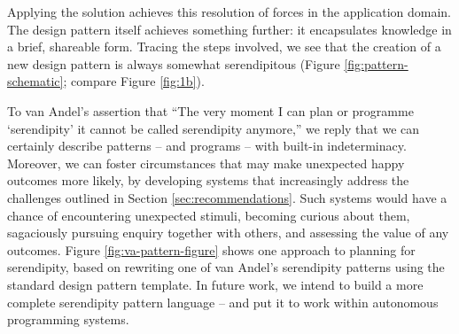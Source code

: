 %
%
Applying the solution achieves this resolution of forces in the
application domain.
The design pattern itself achieves something further: it encapsulates
knowledge in a brief, shareable form.  Tracing the steps involved, we
see that the creation of a new design pattern is always somewhat
serendipitous (Figure \ref{fig:pattern-schematic}; compare Figure
\ref{fig:1b}).

To van Andel's assertion that ``The very moment I can plan or
programme `serendipity' it cannot be called serendipity anymore,'' we
reply that we can certainly describe patterns -- and programs -- with
built-in indeterminacy.  Moreover, we can foster circumstances that
may make unexpected happy outcomes more likely, by developing systems
that increasingly address the challenges outlined in Section
\ref{sec:recommendations}.  Such systems would have a chance of encountering
unexpected stimuli, becoming curious about them, sagaciously pursuing enquiry
together with others, and assessing the value of any outcomes.  
%
Figure \ref{fig:va-pattern-figure} shows one approach to
planning for serendipity, based on rewriting one of van Andel's
serendipity patterns using the standard design pattern template.  In
future work, we intend to build a more complete serendipity pattern
language -- and put it to work within autonomous programming systems.




